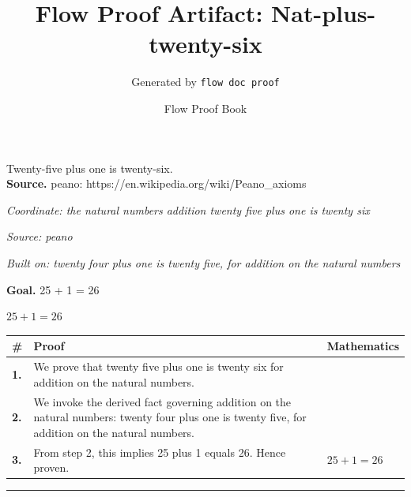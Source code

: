 \documentclass[11pt]{article}
\title{Flow Proof Artifact: Nat-plus-twenty-six}
\author{Generated by \texttt{flow doc proof}}
\date{Flow Proof Book}
\theoremstyle{definition}
\begin{document}
\maketitle
Twenty-five plus one is twenty-six.\\[0.5em]
\textbf{Source.} peano: https://en.wikipedia.org/wiki/Peano\_axioms\\[0.5em]
\bigskip
{}\par
\smallskip\noindent\textit{Coordinate: the natural numbers \cdot addition \cdot twenty five plus one is twenty six}\par
\smallskip\noindent\textit{Source: peano}\par
\smallskip\noindent\textit{Built on: twenty four plus one is twenty five, for addition on the natural numbers}\par
\medskip
\noindent\textbf{Goal.} 25 + 1 = 26\par
\noindent$\displaystyle 25 + 1 = 26$\par
\medskip
\noindent
\begin{tabular}{@{} >{\raggedright\arraybackslash}p{} >{\raggedright\arraybackslash}p{} >{\raggedleft\arraybackslash}p{} @{}}
\textbf{\#} & \textbf{Proof} & \textbf{Mathematics} \\
\midrule
\textbf{1.} & We prove that twenty five plus one is twenty six for addition on the natural numbers. & \\[0.45em]
\textbf{2.} & We invoke the derived fact governing addition on the natural numbers: twenty four plus one is twenty five, for addition on the natural numbers. & \\[0.45em]
\textbf{3.} & From step 2, this implies 25 plus 1 equals 26. Hence proven. & $\displaystyle 25 + 1 = 26$ \\[0.45em]
\bottomrule
\end{tabular}
\label{thm:Nat-addition-twenty_five_plus_one_is_twenty_six}
\par\medskip\hrule
\end{document}
